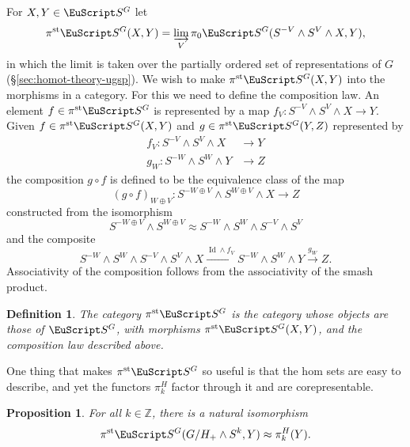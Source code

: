 \documentclass{amsart}
\newtheorem{prop}[equation]{Proposition}
\newtheorem{definition}[equation]{Definition}
\newenvironment{defin}{\begin{definition}\rm}{\end{definition}}
\theoremstyle{definition}
\newtheorem{defin}[equation]{Definition}
\theoremstyle{remark}
\newcommand{\Z}{{\mathbb Z}}
\newcommand{\spectra}{\EuScript S}
\newcommand{\ugspectra}[1]{\spectra^{#1}}
\newcommand{\pist}{\pi^{\text{st}}}
\DeclareMathOperator{\id}{Id}
\begin{document}
For $X, Y\in\ugspectra{G}$ let
\[
\pist\ugspectra{G}(X,Y) = \varinjlim_{V}\pi_{0}\ugspectra{G}(S^{-V}\wedge
S^{V}\wedge X, Y),
\]
in which the limit is taken over the partially ordered set of
representations of $G$ (\S\ref{sec:homot-theory-ugsp}).  We wish to
make $\pist\ugspectra{G}(X,Y)$ into the morphisms in a category.  For
this we need to define the composition law.  An element
$f\in\pist\ugspectra{G}$ is represented by a map $f_{V}:S^{-V}\wedge
S^{V}\wedge X\to Y$.  Given $f\in \pist\ugspectra{G}(X,Y)$ and
$g\in\pist\ugspectra{G}(Y,Z)$ represented by
\begin{align*}
f_{V}:S^{-V}\wedge S^{V}\wedge X &\to Y  \\
g_{W}:S^{-W}\wedge S^{W}\wedge Y &\to Z 
\end{align*}
the composition $g\circ f$ is defined to be the equivalence class of
the map 
\[
(g\circ f)_{W\oplus V}:S^{-W\oplus V}\wedge S^{W\oplus V}\wedge X\to Z
\]
constructed from the isomorphism 
\[
S^{-W\oplus V}\wedge S^{W\oplus V}\approx
S^{-W}\wedge S^{W}\wedge S^{-V}\wedge S^{V}
\]
and the composite
\[
S^{-W}\wedge S^{W}\wedge S^{-V}\wedge S^{V}\wedge X
\xrightarrow{\id\wedge f_{V}}
S^{-W}\wedge S^{W}\wedge Y \xrightarrow{g_{W}} Z.
\]
Associativity of the composition follows from the associativity of the
smash product.   

\begin{defin}
\label{def:9} The category $\pist\ugspectra{G}$ is the category whose
objects are those of $\ugspectra{G}$, with morphisms
$\pist\ugspectra{G}(X,Y)$, and the composition law described above.
\end{defin}

One thing that makes $\pist\ugspectra{G}$ so useful is that the hom
sets are easy to describe, and yet the functors $\pi^{H}_{k}$ factor
through it and are corepresentable.

\begin{prop}
\label{thm:88}
For all $k\in\Z$, there is a natural isomorphism
\begin{equation}
\label{eq:169}
\pist\ugspectra{G}(G/H_{+}\wedge S^{k}, Y) \approx \pi^{H}_{k}(Y).
\end{equation}
\end{prop}
\end{document}
